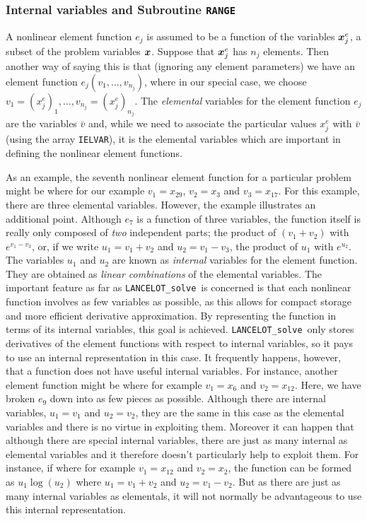 \documentclass{galahad}
\newcommand{\fullpackagename}{LANC\-E\-LOT}
\newcommand{\solver}{{\tt \fullpackagename\_solve}}
\begin{document}

\subsubsection{\label{internal_and_ranges}Internal variables and
Subroutine {\tt RANGE}}

A nonlinear element function $e_j$ is assumed to be a function of
the variables ${\bm{x}}^e_j$, a subset of the problem variables
${\bm{x}}$. Suppose that ${\bm{x}}^e_j$ has $n_j$ elements. Then
another way of saying this is that (ignoring any element parameters)
we have an element function $e_j( v_1, \ldots, v_{n_j})$, where
in our special case, we choose
$v_1= (x^e_j)_1, \ldots, v_{n_j}= (x^e_j)_{n_j}$.
The {\em elemental} variables
for the element function $e_j$ are the variables
$\bar{v}$ and, while we need to associate the particular values
$x^e_j$ with $\bar{v}$ (using the array {\tt IELVAR}),
it is the elemental variables which
are important in defining the nonlinear element functions.

As an example, the seventh nonlinear element function for a
particular problem might be
where for our example
$v_1 = x_{29}$, $ v_2 = x_3$ and $v_3 = x_{17}$.
For this example, there are three elemental variables.
However, the
example illustrates an additional point. Although $e_7$ is
a function of three variables, the function itself is really
only composed of {\em two} independent parts; the product of
$(v_1 + v_2)$ with $e^{v_1 - v_3}$, or, if we write
$u_1 = v_1 + v_2$ and $u_2 = v_1 - v_3$, the product of
$u_1$ with $e^{u_2}$.
The variables $u_1$ and $u_2$ are known as {\em internal}
variables
for the element function.
They are obtained as {\em linear combinations} of the elemental variables.
The
important feature as far as \solver\ is concerned is that each
nonlinear function involves as few variables as possible, as
this allows for compact storage and more efficient derivative
approximation. By representing the function in terms of its internal
variables, this goal is achieved.
\solver\ only stores derivatives of the element
functions with respect to internal variables, so it pays to
use an internal representation in this case.
It frequently happens,
however, that a function does not have useful internal variables.
For instance, another element function
might be
where for example $ v_1 = x_6$ and $v_2 = x_{12}$.
Here, we have broken $e_9$ down into as few pieces as possible.
Although there are internal variables,
$u_1 = v_1$ and $u_2 = v_2$,
they are the same in this
case as the elemental variables
and there is no virtue in exploiting them.
Moreover it can happen that although there are
special internal variables,
there are just as many internal as elemental
variables and it therefore doesn't particularly
help to exploit them.
For instance, if
where for example
$v_1 = x_{12}$ and $ v_2 = x_2$, the function can be formed as
$u_1 \log(u_2)$ where $u_1 = v_1 + v_2$ and $u_2 = v_1 - v_2$.
But as there are just
as many internal variables as elementals, it will not normally be
advantageous to use this internal representation.
\end{document}
